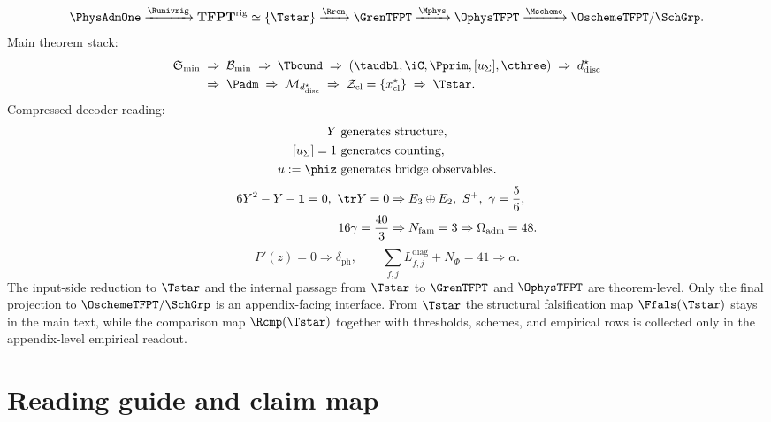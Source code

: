 \begin{tcolorbox}[colback=tfptblue!2, colframe=tfptblue!40, breakable,
    title={Closed architecture of the paper}, colbacktitle=tfptblue!60]
\[
\PhysAdmOne
\xrightarrow{\Runivrig}
\mathbf{TFPT}^{\mathrm{rig}}
\simeq
\{\Tstar\}
\xrightarrow{\Rren}
\GrenTFPT
\xrightarrow{\Mphys}
\OphysTFPT
\xrightarrow{\Mscheme}
\OschemeTFPT/\SchGrp.
\]
Main theorem stack:
\[
\begin{aligned}
\mathfrak S_{\min}
&\;\Rightarrow\;
\mathcal B_{\min}
\;\Rightarrow\;
\Tbound
\;\Rightarrow\;
(\taudbl,\iC,\Pprim,[u_\Sigma],\cthree)
\;\Rightarrow\;
d^\star_{\mathrm{disc}}
\\
&\;\Rightarrow\;
\Padm
\;\Rightarrow\;
\mathcal M_{d^\star_{\mathrm{disc}}}
\;\Rightarrow\;
\mathcal Z_{\mathrm{cl}}=\{x^\star_{\mathrm{cl}}\}
\;\Rightarrow\;
\Tstar.
\end{aligned}
\]
Compressed decoder reading:
\[
\begin{aligned}
Y&\ \text{generates structure},\\
[u_\Sigma]=1&\ \text{generates counting},\\
u:=\phiz&\ \text{generates bridge observables}.
\end{aligned}
\]
\[
\begin{aligned}
6Y^2-Y-\mathbf 1=0,\ \tr Y=0
&\Rightarrow
E_3\oplus E_2,\ S^+,\ \gamma=\frac56,\\
16\gamma=\frac{40}{3}
&\Rightarrow
N_{\mathrm{fam}}=3
\Rightarrow
\Omega_{\mathrm{adm}}=48.
\end{aligned}
\]
\[
P'(z)=0
\Rightarrow
\delta_{\mathrm{ph}},
\qquad
\sum_{f,j}L_{f,j}^{\mathrm{diag}}+N_\Phi=41
\Rightarrow
\alpha.
\]
The input-side reduction to $\Tstar$ and the internal passage from $\Tstar$ to $\GrenTFPT$ and
$\OphysTFPT$ are theorem-level. Only the final projection to $\OschemeTFPT/\SchGrp$ is an
appendix-facing interface. From $\Tstar$ the structural falsification map $\Ffals(\Tstar)$ stays in
the main text, while the comparison map $\Rcmp(\Tstar)$ together with thresholds, schemes, and
empirical rows is collected only in the appendix-level empirical readout.
\end{tcolorbox}

\tableofcontents

\section{Reading guide and claim map}

